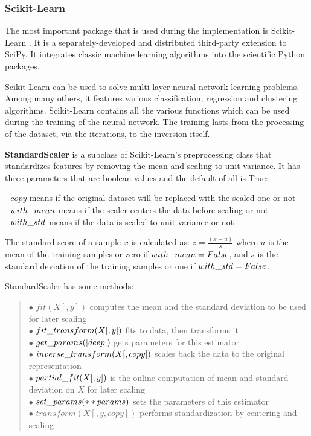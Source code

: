 \subsubsection{Scikit-Learn}

The most important package that is used during the implementation is Scikit-Learn \cite{Pedregosa2011ScikitlearnML}. It is a separately-developed and distributed third-party extension to SciPy. It integrates classic machine learning algorithms into the scientific Python packages. \smallskip

Scikit-Learn can be used to solve multi-layer neural network learning problems. Among many others, it features various classification, regression and clustering algorithms. Scikit-Learn contains all the various functions which can be used during the training of the neural network. The training lasts from the processing of the dataset, via the iterations, to the inversion itself. \bigskip

\textbf{StandardScaler} is a subclass of Scikit-Learn's preprocessing class that standardizes features by removing the mean and scaling to unit variance. It has three parameters that are boolean values and the default of all is True: \smallskip

\noindent - $copy$ means if the original dataset will be replaced with the scaled one or not\\
- $with\char`_mean$ means if the scaler centers the data before scaling or not\\
- $with\char`_std$ means if the data is scaled to unit variance or not \medskip

The standard score of a sample $x$ is calculated as: $z = \frac{(x - u)}{s}$ where $u$ is the mean of the training samples or zero if $with\char`_mean=False$, and $s$ is the standard deviation of the training samples or one if $with\char`_std=False$. \medskip

\noindent StandardScaler has some methods:
\begin{verse}
	$\bullet$ $fit(X[, y])$ computes the mean and the standard deviation to be used for later scaling\\
	$\bullet$ $fit\char`_transform(X[, y])$ fits to data, then transforms it\\
	$\bullet$ $get\char`_params([deep])$ gets parameters for this estimator\\
	$\bullet$ $inverse\char`_transform(X[, copy])$ scales back the data to the original representation\\
	$\bullet$ $partial\char`_fit(X[, y])$ is the online computation of mean and standard deviation on $X$ for later scaling\\
	$\bullet$ $set\char`_params(**params)$ sets the parameters of this estimator\\
	$\bullet$ $transform(X[, y, copy])$ performs standardization by centering and scaling
\end{verse}\medskip

